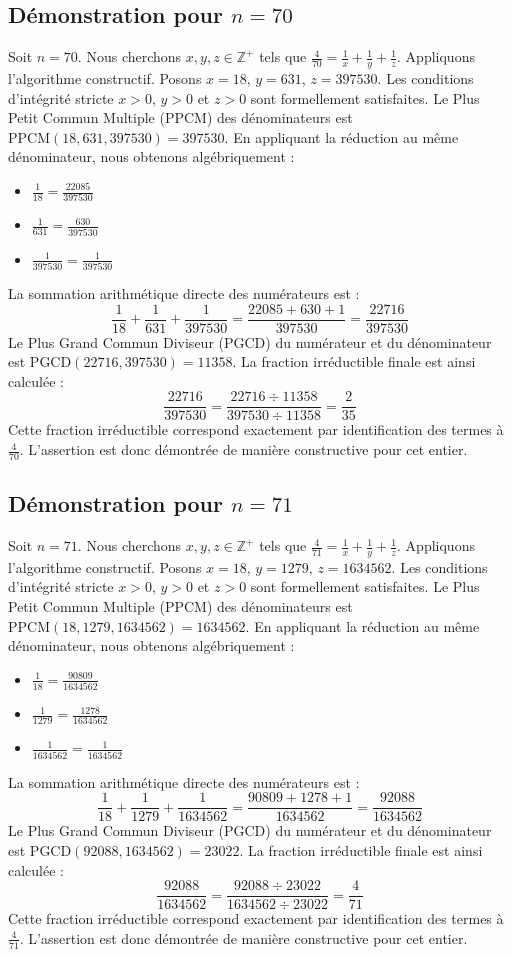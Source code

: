 \documentclass[11pt,a4paper]{article}
\begin{document}
\subsection{Démonstration pour $n = 70$}
Soit $n = 70$. Nous cherchons $x, y, z \in \mathbb{Z}^{+}$ tels que $\frac{4}{70} = \frac{1}{x} + \frac{1}{y} + \frac{1}{z}$.
Appliquons l'algorithme constructif. Posons $x = 18$, $y = 631$, $z = 397530$.
Les conditions d'intégrité stricte $x > 0$, $y > 0$ et $z > 0$ sont formellement satisfaites.
Le Plus Petit Commun Multiple (PPCM) des dénominateurs est $\text{PPCM}(18, 631, 397530) = 397530$.
En appliquant la réduction au même dénominateur, nous obtenons algébriquement :
\begin{itemize}
    \item $\frac{1}{18} = \frac{22085}{397530}$
    \item $\frac{1}{631} = \frac{630}{397530}$
    \item $\frac{1}{397530} = \frac{1}{397530}$
\end{itemize}
La sommation arithmétique directe des numérateurs est :
$$ \frac{1}{18} + \frac{1}{631} + \frac{1}{397530} = \frac{22085 + 630 + 1}{397530} = \frac{22716}{397530} $$
Le Plus Grand Commun Diviseur (PGCD) du numérateur et du dénominateur est $\text{PGCD}(22716, 397530) = 11358$.
La fraction irréductible finale est ainsi calculée :
$$ \frac{22716}{397530} = \frac{22716 \div 11358}{397530 \div 11358} = \frac{2}{35} $$
Cette fraction irréductible correspond exactement par identification des termes à $\frac{4}{70}$. L'assertion est donc démontrée de manière constructive pour cet entier.

\subsection{Démonstration pour $n = 71$}
Soit $n = 71$. Nous cherchons $x, y, z \in \mathbb{Z}^{+}$ tels que $\frac{4}{71} = \frac{1}{x} + \frac{1}{y} + \frac{1}{z}$.
Appliquons l'algorithme constructif. Posons $x = 18$, $y = 1279$, $z = 1634562$.
Les conditions d'intégrité stricte $x > 0$, $y > 0$ et $z > 0$ sont formellement satisfaites.
Le Plus Petit Commun Multiple (PPCM) des dénominateurs est $\text{PPCM}(18, 1279, 1634562) = 1634562$.
En appliquant la réduction au même dénominateur, nous obtenons algébriquement :
\begin{itemize}
    \item $\frac{1}{18} = \frac{90809}{1634562}$
    \item $\frac{1}{1279} = \frac{1278}{1634562}$
    \item $\frac{1}{1634562} = \frac{1}{1634562}$
\end{itemize}
La sommation arithmétique directe des numérateurs est :
$$ \frac{1}{18} + \frac{1}{1279} + \frac{1}{1634562} = \frac{90809 + 1278 + 1}{1634562} = \frac{92088}{1634562} $$
Le Plus Grand Commun Diviseur (PGCD) du numérateur et du dénominateur est $\text{PGCD}(92088, 1634562) = 23022$.
La fraction irréductible finale est ainsi calculée :
$$ \frac{92088}{1634562} = \frac{92088 \div 23022}{1634562 \div 23022} = \frac{4}{71} $$
Cette fraction irréductible correspond exactement par identification des termes à $\frac{4}{71}$. L'assertion est donc démontrée de manière constructive pour cet entier.
\end{document}
